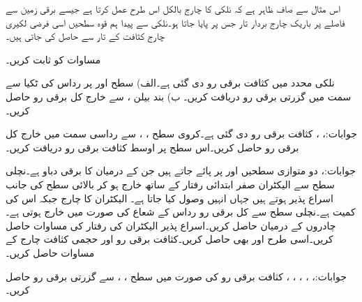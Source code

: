 \begin{itemize}
\end{itemize}

اس مثال سے صاف ظاہر ہے کہ نلکی کا چارج بالکل اس طرح عمل کرتا ہے جیسے برقی زمین سے   فاصلے پر باریک چارج بردار تار جس پر   پایا جاتا ہو۔نلکی سے پیدا ہم قوہ سطحیں اسی فرضی لکیری چارج کثافت کے تار سے حاصل کی جاتی ہیں۔

مساوات  کو ثابت کریں۔
\newpage



نلکی محدد میں کثافت برقی رو  دی گئی ہے۔الف) سطح  اور  پر رداس  کی ٹکیا سے  سمت میں گزرتی برقی رو دریافت کریں۔ ب) بند بیلن ،  سے خارج کل برقی رو حاصل کریں۔

جوابات:، ، 
کثافت برقی رو  دی گئی ہے۔کروی سطح ، ،  سے رداسی سمت میں خارج کل برقی رو حاصل کریں۔اس سطح پر اوسط کثافت برقی رو دریافت کریں۔

جوابات:، 
دو متوازی سطحیں  اور  پر پائے جاتے ہیں جن کے درمیان  کا برقی دباو ہے۔نچلی سطح سے الیکٹران صفر ابتدائی رفتار کے ساتھ خارج ہو کر بالائی سطح کی جانب اسراع پذیر ہوتے ہیں جہاں انہیں وصول کیا جاتا ہے۔ الیکٹران کا چارج  جبکہ اس کی کمیت  ہے۔نچلی سطح سے کل  برقی رو  رداس کے شعاع کی صورت میں خارج ہوتی ہے۔چادروں کے درمیان  حاصل کریں۔اسراع پذیر الیکٹران کی رفتار  کی مساوات حاصل کریں۔اسی طرح  اور  بھی حاصل کریں۔کثافت برقی رو اور حجمی کثافت چارج کے مساوات حاصل کریں۔

جوابات:، ، ، ، ،  
کثافت برقی رو  کی صورت میں سطح ،  ، سے گزرتی برقی رو حاصل کریں۔

